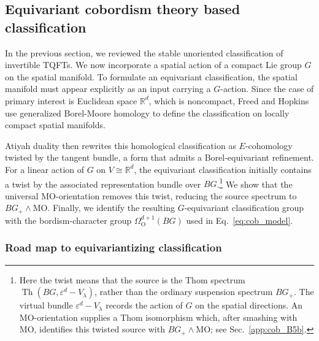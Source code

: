 \documentclass[aps,prx,reprint,superscriptaddress,twocolumn,amsmath,amssymb,amsfonts, nofootinbib]{revtex4-2}
\theoremstyle{apsstyle}
\begin{document}
\subsection{Equivariant cobordism theory based classification}
\label{app:cob2}


In the previous section, we reviewed the stable unoriented classification of invertible TQFTs. We now incorporate a spatial action of a compact Lie group $G$ on the spatial manifold. To formulate an equivariant classification, the spatial manifold must appear explicitly as an input carrying a $G$-action. Since the case of primary interest is Euclidean space $\mathbb R^d$, which is noncompact, Freed and Hopkins use generalized Borel-Moore homology to define the classification on locally compact spatial manifolds.

\bigskip 

\noindent Atiyah duality then rewrites this homological classification as
$E$-cohomology twisted by the tangent bundle, a form that admits a
Borel-equivariant refinement. For a linear action of $G$ on
$V\cong\mathbb R^d$, the equivariant classification initially contains
a twist by the associated representation bundle over $BG$.\footnote{Here the twist means that the source is the Thom spectrum $\operatorname{Th}(BG,\varepsilon^d-V_\lambda)$, rather than the ordinary suspension spectrum $BG_+$. The virtual bundle $\varepsilon^d-V_\lambda$ records the action of $G$ on the spatial directions. An $\mathrm{MO}$-orientation supplies a Thom isomorphism which, after smashing with $\mathrm{MO}$, identifies this twisted source with $BG_+\wedge\mathrm{MO}$; see Sec.~\ref{app:cob_B5b}.} We show
that the universal $\mathrm{MO}$-orientation removes this twist,
reducing the source spectrum to $BG_+\wedge\mathrm{MO}$. Finally, we
identify the resulting $G$-equivariant classification group with the
bordism-character group $\Omega_{\mathrm O}^{d+1}(BG)$ used in
Eq.~\eqref{eq:cob_model}.



\subsubsection{Road map to equivariantizing classification}
\end{document}
